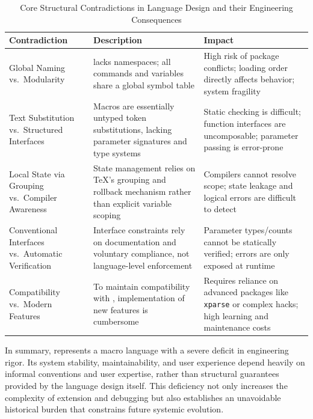 \begin{table}[htbp]
    \centering
    \caption{Core Structural Contradictions in \LaTeXe{} Language Design and their Engineering Consequences}
    \label{tab:latex-contradictions}
    \begin{tabular}{p{3.5cm}p{5cm}p{4cm}}
        \toprule
        \textbf{Contradiction}                              & \textbf{Description}                                                                                      & \textbf{Impact}                                                                                                   \\
        \midrule
        Global Naming vs.\ Modularity                       & \LaTeXe{} lacks namespaces; all commands and variables share a global symbol table                        & High risk of package conflicts; loading order directly affects behavior; system fragility                         \\
        Text Substitution vs.\ Structured Interfaces        & Macros are essentially untyped token substitutions, lacking parameter signatures and type systems         & Static checking is difficult; function interfaces are uncomposable; parameter passing is error-prone              \\
        Local State via Grouping vs.\ Compiler Awareness    & State management relies on \TeX{}'s grouping and rollback mechanism rather than explicit variable scoping & Compilers cannot resolve scope; state leakage and logical errors are difficult to detect                          \\
        Conventional Interfaces vs.\ Automatic Verification & Interface constraints rely on documentation and voluntary compliance, not language-level enforcement      & Parameter types/counts cannot be statically verified; errors are only exposed at runtime                          \\
        Compatibility vs.\ Modern Features                  & To maintain compatibility with \LaTeXe{}, implementation of new features is cumbersome                    & Requires reliance on advanced packages like \texttt{xparse} or complex hacks; high learning and maintenance costs \\
        \bottomrule
    \end{tabular}
\end{table}

In summary, \LaTeXe{} represents a macro language with a severe deficit in engineering rigor. Its system stability, maintainability, and user experience depend heavily on informal conventions and user expertise, rather than structural guarantees provided by the language design itself. This deficiency not only increases the complexity of extension and debugging but also establishes an unavoidable historical burden that constrains future systemic evolution.

